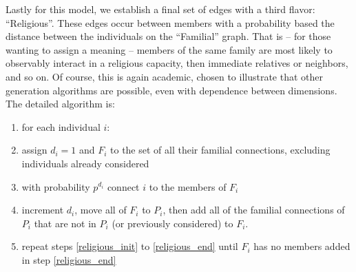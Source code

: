 \documentclass{article}
\begin{document}
Lastly for this model, we establish a final set of edges with a third flavor: ``Religious''.  These edges occur between members with a probability based the distance between the individuals on the ``Familial'' graph.  That is -- for those wanting to assign a meaning -- members of the same family are most likely to observably interact in a religious capacity, then immediate relatives or neighbors, and so on.  Of course, this is again academic, chosen to illustrate that other generation algorithms are possible, even with dependence between dimensions.  The detailed algorithm is:\begin{enumerate}
\item\label{religious_init} for each individual $i$:
\item assign $d_i=1$ and $F_i$ to the set of all their familial connections, excluding individuals already considered
\item with probability $p^{d_i}$ connect $i$ to the members of $F_i$
\item\label{religious_end} increment $d_i$, move all of $F_i$ to $P_i$, then add all of the familial connections of $P_i$ that are not in $P_i$ (or previously considered) to $F_i$.
\item repeat steps \ref{religious_init} to \ref{religious_end} until $F_i$ has no members added in step \ref{religious_end} 
\end{enumerate}
\end{document}
